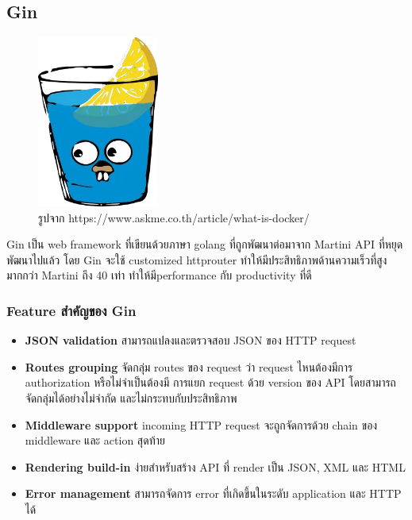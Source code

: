 \subsection{Gin}
\begin{figure}[H]
  \centering
  \includegraphics[width=40mm, keepaspectratio ]{pictures/gin.png}
  \caption[Gin]{รูปจาก https://www.askme.co.th/article/what-is-docker/}
  \label{fig:gin}
\end{figure}
\hspace{1.27cm}Gin\cite{Gin101} เป็น web framework ที่เขียนด้วยภาษา golang ที่ถูกพัฒนาต่อมาจาก Martini API ที่หยุดพัฒนาไปแล้ว โดย Gin จะใช้ customized httprouter ทำให้มีประสิทธิภาพด้านความเร็วที่สูงมากกว่า Martini ถึง 40 \cite{GinFeature}เท่า ทำให้มีperformance กับ productivity ที่ดี 

\subsubsection{Feature สำคัญของ Gin }
\begin{itemize}
  \item \textbf{JSON validation} สามารถแปลงและตรวจสอบ JSON ของ HTTP request
  \item \textbf{Routes grouping} จัดกลุ่ม routes ของ request ว่า request ไหนต้องมีการ authorization หรือไม่จำเป็นต้องมี การแยก request ด้วย version ของ API โดยสามารถจัดกลุ่มได้อย่างไม่จำกัด และไม่กระทบกับประสิทธิภาพ
  \item \textbf{Middleware support} incoming HTTP request จะถูกจัดการด้วย chain ของ middleware และ action สุดท้าย
  \item \textbf{Rendering build-in} ง่ายสำหรับสร้าง API ที่ render เป็น JSON, XML และ HTML
  \item \textbf{Error management} สามารถจัดการ error ที่เกิดขึ้นในระดับ application และ HTTP ได้
\end{itemize}

